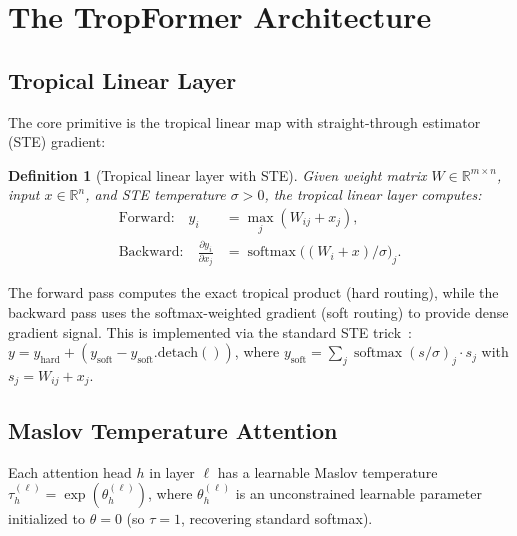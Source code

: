 \documentclass[11pt,twocolumn]{article}
\newtheorem{definition}[theorem]{Definition}
\newcommand{\R}{\mathbb{R}}
\newcommand{\softmax}{\operatorname{softmax}}
\begin{document}
\section{The TropFormer Architecture}\label{sec:architecture}

\subsection{Tropical Linear Layer}

The core primitive is the tropical linear map with straight-through estimator
(STE) gradient:

\begin{definition}[Tropical linear layer with STE]
Given weight matrix $W \in \R^{m \times n}$, input $x \in \R^n$, and STE
temperature $\sigma > 0$, the tropical linear layer computes:
\begin{align}
  \text{Forward:} \quad y_i &= \max_j(W_{ij} + x_j), \label{eq:trop-fwd} \\
  \text{Backward:} \quad \frac{\partial y_i}{\partial x_j}
    &= \softmax\bigl((W_i + x)/\sigma\bigr)_j. \label{eq:trop-bwd}
\end{align}
\end{definition}

The forward pass computes the exact tropical product (hard routing), while the
backward pass uses the softmax-weighted gradient (soft routing) to provide
dense gradient signal. This is implemented via the standard STE
trick~\cite{bengio2013estimating}:
$y = y_{\text{hard}} + (y_{\text{soft}} - y_{\text{soft}}.\text{detach}())$,
where $y_{\text{soft}} = \sum_j \softmax(s/\sigma)_j \cdot s_j$ with
$s_j = W_{ij} + x_j$.

\subsection{Maslov Temperature Attention}\label{sec:maslov-attn}

Each attention head $h$ in layer $\ell$ has a learnable Maslov temperature
$\tau_h^{(\ell)} = \exp(\theta_h^{(\ell)})$, where $\theta_h^{(\ell)}$ is an
unconstrained learnable parameter initialized to $\theta = 0$ (so $\tau = 1$,
recovering standard softmax).
\end{document}
